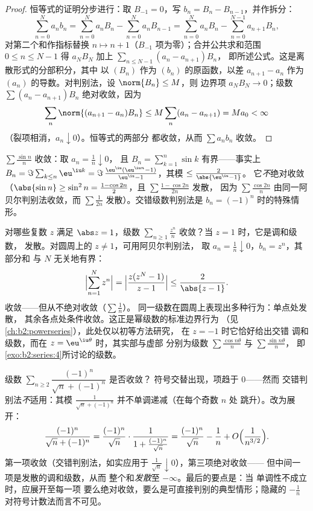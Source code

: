 \begin{proof}
恒等式的证明分步进行：取 $B_{-1} = 0$，写 $b_n = B_n -
B_{n-1}$，并作拆分：
\[
\sum_{n=0}^{N} a_nb_n
= \sum_{n=0}^{N} a_nB_n - \sum_{n=0}^{N} a_nB_{n-1}
= \sum_{n=0}^{N} a_nB_n - \sum_{n=0}^{N-1} a_{n+1}B_{n} ,
\]
对第二个和作指标替换 $n \mapsto n + 1$（$B_{-1}$
项为零）；合并公共求和范围 $0 \leq n \leq N-1$
得 $a_NB_N$ 加上 $\sum_{n\leq N-1}(a_n - a_{n+1})B_n$，
即所述公式。这是离散形式的分部积分，其中
以 $(B_n)$ 作为 $(b_n)$ 的原函数，以差 $a_{n+1}
- a_n$ 作为 $(a_n)$ 的导数。对判别法，设 $\norm{B_n}
\leq M$，则
边界项 $a_N B_N \to 0$；级数 $\sum (a_n -
a_{n+1})B_n$ 绝对收敛，因为
\[
\sum_n \norm{(a_{n+1} - a_n)B_n} \leq M \sum_n (a_n - a_{n+1})
= M a_0 < \infty
\]
（裂项相消，$a_n \downarrow 0$）。恒等式的两部分
都收敛，从而 $\sum a_n b_n$ 收敛。
\end{proof}

\begin{example}\label{ex:b2:series:sinn}
$\sum \frac{\sin n}{n}$ 收敛：取 $a_n = \frac1n \downarrow 0$，
且 $B_n = \sum_{k=1}^{n} \sin k$ 有界——事实上 $B_n =
\Im\sum_{k \leq n} \eu^{\iu k} = \Im\,\frac{\eu^{\iu}(\eu^{\iu n} -
1)}{\eu^{\iu} - 1}$，其模 $\leq \frac{2}{\abs{\eu^{\iu} - 1}}$。
它\emph{不}绝对收敛（$\abs{\sin n} \geq \sin^2 n
= \frac{1 - \cos 2n}{2}$，且 $\sum \frac{1 - \cos 2n}{2n}$ 发散，
因为 $\sum \frac{\cos 2n}{n}$ 由同一阿贝尔判别法收敛，而
$\sum \frac{1}{2n}$ 发散）。交错级数判别法是
$b_n = (-1)^n$ 时的特殊情形。
\end{example}

\begin{example}[收敛圆周上的阿贝尔判别法]\label{ex:b2:series:abelboundary}
对哪些复数 $z$ 满足 $\abs z = 1$，级数 $\sum_{n \geq 1}
\frac{z^n}{n}$ 收敛？当 $z = 1$ 时，它是调和级数，
发散。对圆周上的 $z \neq 1$，可用阿贝尔判别法，
取 $a_n = \frac1n \downarrow 0$，$b_n = z^n$，其部分和
与 $N$ 无关地有界：
\[
\Bigl|\sum_{n=1}^{N} z^n\Bigr|
= \Bigl|\frac{z(z^N - 1)}{z - 1}\Bigr|
\leq \frac{2}{\abs{z - 1}} .
\]
收敛——但从不绝对收敛（$\sum\frac1n$）。
同一级数在圆周上表现出多种行为：单点处发散，
其余各点处条件收敛。这正是幂级数的标准边界行为
（见\cref{ch:b2:powerseries}），此处仅以初等方法研究，
在 $z = -1$ 时它恰好给出交错
调和级数，而在 $z = \eu^{\iu\theta}$ 时，其实部与虚部
分别为级数 $\sum\frac{\cos
n\theta}{n}$ 与 $\sum\frac{\sin n\theta}{n}$，
即\cref{exo:b2:series:4}所讨论的级数。
\end{example}

\begin{example}[暗藏陷阱的交错级数]\label{ex:b2:series:trap}
级数 $\sum_{n\geq2} \dfrac{(-1)^n}{\sqrt n + (-1)^n}$ 是否收敛？
符号交替出现，项趋于 $0$——然而
交错判别法\emph{不}适用：其模
$\frac{1}{\sqrt n + (-1)^n}$ 并不单调递减（在每个奇数 $n$ 处
跳升）。改为展开：
\[
\frac{(-1)^n}{\sqrt n + (-1)^n}
= \frac{(-1)^n}{\sqrt n}\cdot
\frac{1}{1 + \frac{(-1)^n}{\sqrt n}}
= \frac{(-1)^n}{\sqrt n} - \frac{1}{n}
+ O\Bigl(\frac{1}{n^{3/2}}\Bigr).
\]
第一项收敛（交错判别法，如实应用于
$\frac1{\sqrt n}\downarrow0$），第三项绝对收敛——
但中间一项是发散的调和级数，从而
整个和\emph{发散}至 $-\infty$。最后的要点是：当
单调性不成立时，应展开至每一项
要么绝对收敛，要么是可直接判别的典型情形；隐藏的
$-\frac1n$ 对符号计数法而言不可见。
\end{example}

